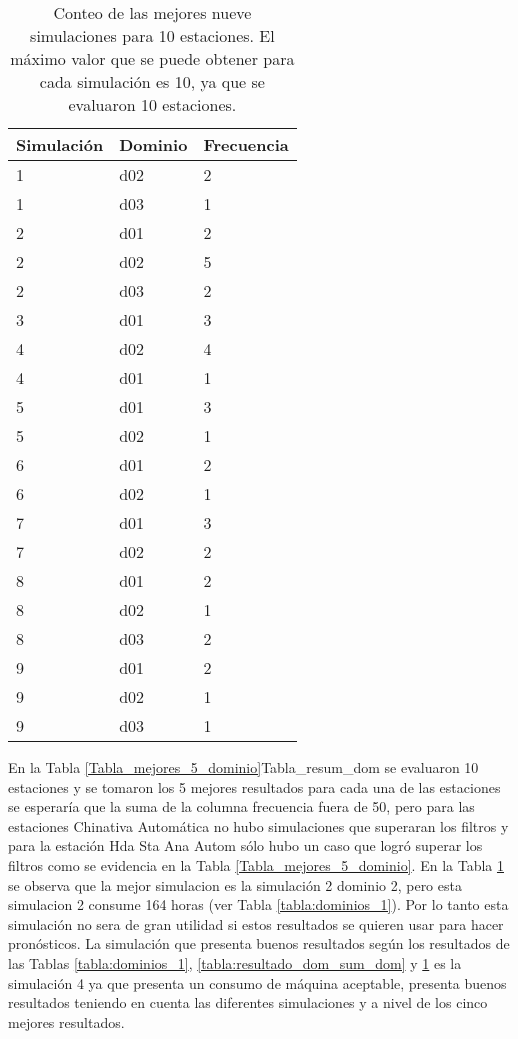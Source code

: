 \begin{table}[H] %
\centering
\caption{Conteo de las mejores nueve simulaciones para 10 estaciones. El máximo valor que se puede obtener para cada simulación es 10, ya que se evaluaron 10 estaciones.}
\begin{tabular}{lll}
Simulación & Dominio & Frecuencia \\ \hline
1   &  d02 &  2 \\
1   &  d03 &  1 \\
2   &  d01 &  2 \\
2   &  d02 &  5 \\
2   &  d03 &  2 \\
3   &  d01 &  3 \\
4   &  d02 &  4 \\
4   &  d01 &  1 \\
5   &  d01 &  3 \\
5   &  d02 &  1 \\
6   &  d01 &  2 \\
6   &  d02 &  1 \\
7   &  d01 &  3 \\
7   &  d02 &  2 \\
8   &  d01 &  2 \\
8   &  d02 &  1 \\
8   &  d03 &  2 \\
9   &  d01 &  2 \\
9   &  d02 &  1 \\
9   &  d03 &  1 \\


\end{tabular}
\label{Tabla_resum_dom}
\end{table}

En la Tabla \ref{Tabla_mejores_5_dominio}{Tabla_resum_dom} se evaluaron 10 estaciones y se tomaron los 5 mejores resultados para cada una de las estaciones se esperaría que la suma de la columna frecuencia fuera de 50, pero para las estaciones Chinativa Automática no hubo simulaciones que superaran los filtros y para la estación Hda Sta Ana Autom sólo hubo un caso que logró superar los filtros como se evidencia en la Tabla \ref{Tabla_mejores_5_dominio}. En la Tabla \ref{Tabla_resum_dom} se observa que la mejor simulacion es la simulación 2 dominio 2, pero esta simulacion 2 consume 164 horas (ver Tabla \ref{tabla:dominios_1}). Por lo tanto esta simulación no sera de gran utilidad si estos resultados se quieren usar para hacer pronósticos. La simulación que presenta buenos resultados según los resultados de las Tablas \ref{tabla:dominios_1}, \ref{tabla:resultado_dom_sum_dom} y \ref{Tabla_resum_dom} es la simulación 4 ya que presenta un consumo de máquina aceptable, presenta buenos resultados teniendo en cuenta las diferentes simulaciones y a nivel de los cinco mejores resultados.\\

